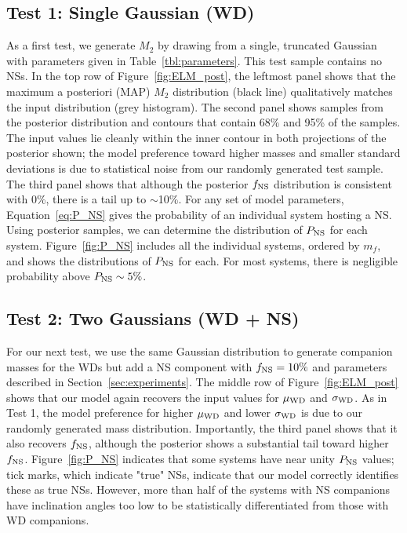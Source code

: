 \documentclass[apjl]{emulateapj}
\newcommand{\mf}{m_f}
\begin{document}
\subsection{Test 1: Single Gaussian (WD)} \label{sec:exp1}

As a first test, we generate $M_2$ by drawing from a single, truncated Gaussian with parameters given in Table~\ref{tbl:parameters}. This test sample contains no NSs. In the top row of Figure~\ref{fig:ELM_post}, the leftmost panel shows that the maximum a posteriori (MAP) $M_2$ distribution (black line) qualitatively matches the input distribution (grey histogram). The second panel shows samples from the posterior distribution and contours that contain 68\% and 95\% of the samples. The input values lie cleanly within the inner contour in both projections of the posterior shown; the model preference toward higher masses and smaller standard deviations is due to statistical noise from our randomly generated test sample. The third panel shows that although the posterior $f_{\rm NS}$ distribution is consistent with 0\%, there is a tail up to $\sim$10\%. 
For any set of model parameters, Equation~\ref{eq:P_NS} gives the probability of an individual system hosting a NS. Using posterior samples, we can determine the distribution of $P_{\rm NS}$ for each system. Figure~\ref{fig:P_NS} includes all the individual systems, ordered by $\mf$, and shows the distributions of $P_{\rm NS}$ for each. For most systems, there is negligible probability above $P_{\rm NS}\sim 5\%$.



\subsection{Test 2: Two Gaussians (WD + NS)} \label{sec:exp2}
For our next test, we use the same Gaussian distribution to generate companion masses for the WDs but add a NS component with $f_{\rm NS} = 10\%$ and parameters described in Section~\ref{sec:experiments}. The middle row of Figure~\ref{fig:ELM_post} shows that our model again recovers the input values for $\mu_{\rm WD}$ and $\sigma_{\rm WD}$. As in Test 1, the model preference for higher $\mu_{\rm WD}$ and lower $\sigma_{\rm WD}$ is due to our randomly generated mass distribution. Importantly, the third panel shows that it also recovers $f_{\rm NS}$, although the posterior shows a substantial tail toward higher $f_{\rm NS}$. Figure~\ref{fig:P_NS} indicates that some systems have near unity $P_{\rm NS}$ values; tick marks, which indicate "true" NSs, indicate that our model correctly identifies these as true NSs. However, more than half of the systems with NS companions have inclination angles too low to be statistically differentiated from those with WD companions. 
\end{document}
